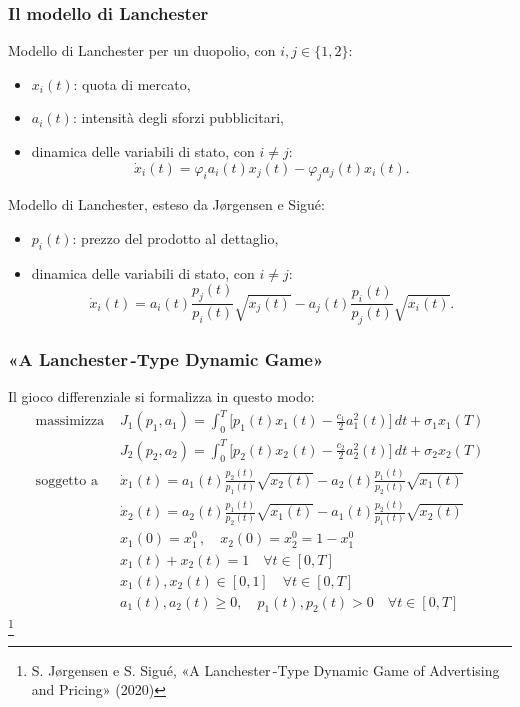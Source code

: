 \documentclass{beamer}
\theoremstyle{plain}
\theoremstyle{definition}
\newcommand\blfootnote[1]{%
  \begingroup
  \renewcommand\thefootnote{}\footnote{#1}%
  \addtocounter{footnote}{-1}%
  \endgroup
}
\begin{document}
\begin{frame}
\frametitle{Il modello di Lanchester}

Modello di Lanchester per un duopolio, con $i,j \in \{1,2\}$: 
\begin{itemize}
    \item $x_i(t)$: quota di mercato,
    \item $a_i(t)$: intensità degli sforzi pubblicitari, 
    \item dinamica delle variabili di stato, con $i \neq j$:
    \[
    \dot{x}_i(t) = \varphi_i a_i(t) x_j(t) - \varphi_j a_j(t) x_i(t).
    \]
\end{itemize}

Modello di Lanchester, esteso da J{\o}rgensen e Sigué:
\begin{itemize}
    \item $p_i(t)$: prezzo del prodotto al dettaglio, 
    \item dinamica delle variabili di stato, con $i \neq j$:
    \[
    \dot{x}_i(t) = a_i(t) \frac{p_j(t)}{p_i(t)} \sqrt{x_j(t)} - a_j(t) \frac{p_i(t)}{p_j(t)} \sqrt{x_i(t)} .
    \]
\end{itemize}

\end{frame}


\begin{frame}
\frametitle{«A Lanchester\,-Type Dynamic Game»}
Il gioco differenziale si formalizza in questo modo: 
\begin{equation*}
\begin{split}
    \text{massimizza   } & J_1(p_1, a_1) = \int_0^T \Big[p_1(t) x_1(t) - \frac{c_1}{2} a_1^2(t)\Big] \, dt + \sigma_1 x_1(T) \\
    & J_2(p_2, a_2) = \int_0^T \Big[p_2(t) x_2(t) - \frac{c_2}{2} a_2^2(t)\Big] \, dt + \sigma_2 x_2(T) \\ 
    \text{soggetto a   } &  \dot{x}_1(t) = a_1(t) \frac{p_2(t)}{p_1(t)} \sqrt{x_2(t)} - a_2(t) \frac{p_1(t)}{p_2(t)} \sqrt{x_1(t)} \\
    & \dot{x}_2(t) = a_2(t) \frac{p_1(t)}{p_2(t)} \sqrt{x_1(t)} - a_1(t) \frac{p_2(t)}{p_1(t)} \sqrt{x_2(t)} \\ 
    & x_1(0) = x_1^0 \,, \quad  x_2(0) = x_2^0 = 1 - x_1^0 \\ 
    & x_1(t) + x_2(t) = 1 \quad \forall t \in [0, T] \\ 
    & x_1(t), x_2(t) \in [0, 1]\quad \forall t \in [0, T] \\ 
    & a_1(t), a_2(t) \geq 0, \quad p_1(t), p_2(t) > 0 \quad \forall t \in [0, T] 
\end{split}
\end{equation*}
\blfootnote{S. J{\o}rgensen e S. Sigué, «A Lanchester\,-Type Dynamic Game of Advertising and Pricing» (2020) }
\end{frame}
\end{document}
